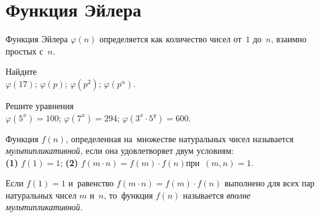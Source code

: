 

\section*{Функция Эйлера}


Функция Эйлера $\varphi(n)$ определяется как количество чисел от~$1$ до~$n$,
взаимно простых с~$n$.

\begin{problems}

\item
Найдите
\\
\sbp $\varphi(17)$;
\qquad
\sbp $\varphi(p)$;
\qquad
\sbp $\varphi(p^2)$;
\qquad
\sbp $\varphi(p^{\alpha})$.

\item
Решите уравнения
\\
\sbp $\varphi(5^x) = 100$;
\qquad
\sbp $\varphi(7^x) = 294$;
\qquad
\sbp $\varphi(3^x \cdot 5^y) = 600$.

\end{problems}

Функция $f(n)$, определенная на~множестве натуральных чисел называется
\emph{мультипликативной,} если она удовлетворяет двум условиям:
\\
\textbf{(1)} $f(1) = 1$;
\qquad
\textbf{(2)} $f(m \cdot n) = f(m) \cdot f(n)$\enspace при~$(m, n) = 1$.

Если $f(1) = 1$ и~равенство $f(m \cdot n) = f(m) \cdot f(n)$ выполнено для всех
пар натуральных чисел $m$ и~$n$, то~функция $f(n)$ называется
\emph{вполне мультипликативной.}


